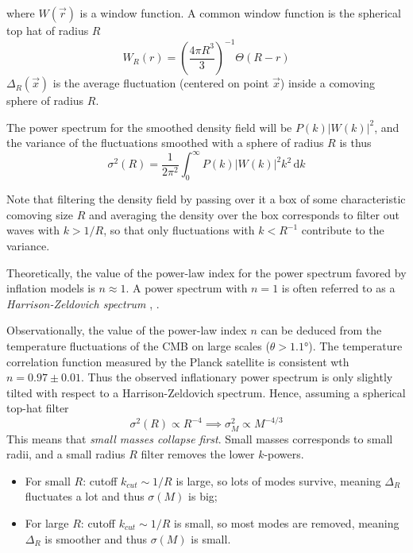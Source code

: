 where $W(\vec{r})$ is a window function. A common window function is the spherical top hat of radius $R$
\begin{equation*}
    W_{R}(r) = \left(\frac{4\pi R^{3}}{3}\right)^{-1}\Theta(R-r)
\end{equation*}
$\Delta_{R}(\vec{x})$ is the average fluctuation (centered on point $\vec{x}$) inside a comoving sphere of radius $R$.
\par The power spectrum for the smoothed density field will be $P(k)|W(k)|^{2}$, and the variance of the fluctuations smoothed with a sphere of radius $R$ is thus
\begin{equation*}
    \sigma^{2}(R) = \frac{1}{2\pi^{2}}\int_{0}^{\infty} P(k)|W(k)|^{2}k^{2}\,\text{d}k
\end{equation*}
\par Note that filtering the density field by passing over it a box of some characteristic comoving size $R$ and averaging the density over the box corresponds to filter out waves with $k > 1/R$, so that only fluctuations with $k<R^{-1}$ contribute to the variance.
\par Theoretically, the value of the power-law index for the power spectrum favored by inflation models is $n \approx 1$. A power spectrum with $n=1$ is often referred to as a \emph{Harrison-Zeldovich spectrum} \cite{PhysRevD.1.2726}, \cite{10.1093/mnras/160.1.1P}.
\par Observationally, the value of the power-law index $n$ can be deduced from the temperature fluctuations of the CMB on large scales ($\theta > 1.1\text{°}$). The temperature correlation function measured by the Planck satellite is consistent wth $n = 0.97\pm 0.01$. Thus the observed inflationary power spectrum is only slightly tilted with respect to a Harrison-Zeldovich spectrum. Hence, assuming a spherical top-hat filter
\begin{equation*}
    \sigma^{2}(R)\propto R^{-4} \implies \sigma^{2}_{M}\propto M^{-4/3}
\end{equation*}
This means that \emph{small masses collapse first}. Small masses corresponds to small radii, and a small radius $R$ filter removes the lower $k$-powers.
\begin{itemize}
    \item For small $R$: cutoff $k_{cut}\sim 1/R$ is large, so lots of modes survive, meaning $\Delta_{R}$ fluctuates a lot and thus $\sigma(M)$ is big;
    \item For large $R$: cutoff $k_{cut}\sim 1/R$ is small, so most modes are removed, meaning $\Delta_{R}$ is smoother and thus $\sigma(M)$ is small.
\end{itemize}
